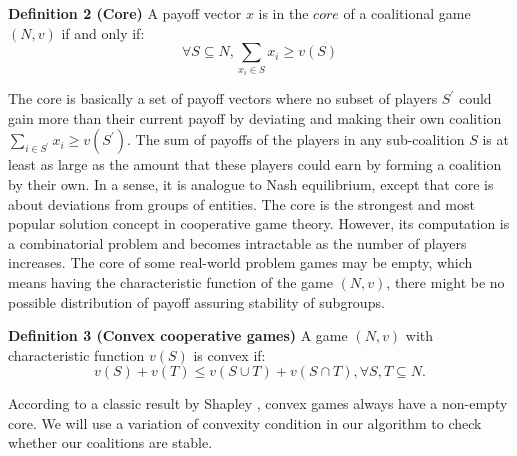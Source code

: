 
            {\bf Definition 2 (Core)} A payoff vector $x$ is in the $core$ of
            a coalitional game $(N, v)$ if and only if:
            \begin{equation}\label{eq:core}
            \forall S \subseteq N, \sum_{x_i \in S} x_i \geq v(S)
            \end{equation}

            The core is basically a set of payoff vectors where no subset of
            players $S^\prime$ could gain more than their current payoff by
            deviating and making their own coalition $\sum_{i \in S^\prime}
            x_i \geq v(S^\prime)$. The sum of payoffs of the players in any
            sub-coalition $S$ is at least as large as the amount that these
            players could earn by forming a coalition by their own. In a
            sense, it is analogue to Nash equilibrium, except that core is
            about deviations from groups of entities. The core is the
            strongest and most popular solution concept in cooperative game
            theory. However, its computation is a combinatorial problem and
            becomes intractable as the number of players increases. The core
            of some real-world problem games may be empty, which means having
            the characteristic function of the game $(N,v)$, there might be no
            possible distribution of payoff assuring stability of subgroups.

            {\bf Definition 3 (Convex cooperative games)} A game $(N,v)$ with
            characteristic function $v(S)$ is convex if:
            \begin{equation}\label{eq:convex}
            v(S) + v(T) \leq v(S \cup T) + v (S \cap T), \forall S,T \subseteq
            N.
            \end{equation}

            According to a classic result by Shapley \cite{S1971cores}, convex
            games always have a non-empty core. We will use a variation of
            convexity condition in our algorithm to check whether our
            coalitions are stable.

